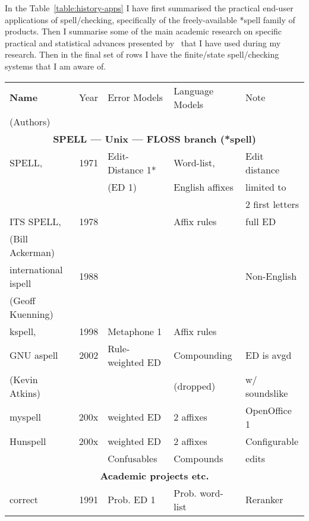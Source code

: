 \documentclass[officiallayout]{unihelcompling}
\begin{document}
In the Table~\ref{table:history-apps} I have first summarised the practical
end-user applications of spell\-/checking, specifically of the freely-available
*spell family of products. Then I summarise some of the main academic research
on specific practical and statistical advances presented
by~\citet{al2006learning} that I have used during my research. Then in the
final set of rows I have the finite\-/state spell\-/checking systems that I am
aware of.

\begin{table}
    \centering
    \begin{scriptsize}
    \begin{tabular}{|l|r|l|l|l|}
        \hline
        \bf Name & Year & Error Models & Language Models & Note \\
(Authors) & & & & \\
        \hline
        \multicolumn{5}{|c|}{\bf SPELL --- Unix --- FLOSS branch (*spell) }\\
        \hline
             SPELL, & 1971 & Edit-Distance 1* & Word-list, & Edit distance \\
        \citep{gorin1971spell} &  & (ED 1) & English affixes & limited to \\
                                  &  & &              & 2 first letters \\
        ITS SPELL, & 1978 &  & Affix rules & full ED \\
     (Bill Ackerman) & & & & \\
        international ispell & 1988 & & & Non-English \\
              (Geoff Kuenning) & & & & \\
        \hline
        kspell, & 1998 & Metaphone 1 & Affix rules & \\
        GNU aspell & 2002 & Rule-weighted ED & Compounding & ED is avgd \\
    (Kevin Atkins) & & & (dropped) & w/ soundslike \\
        \hline
        myspell & 200x & weighted ED & 2 affixes & OpenOffice 1 \\
        \hline
        Hunspell & 200x & weighted ED & 2 affixes & Configurable \\
                 &      & Confusables & Compounds & edits \\
        \hline
        \multicolumn{5}{|c|}{\bf Academic projects etc.} \\
        \hline
        correct & 1991 & Prob. ED 1 & Prob. word-list & Reranker \\

\end{tabular}
\end{scriptsize}
\end{table}
\end{document}
